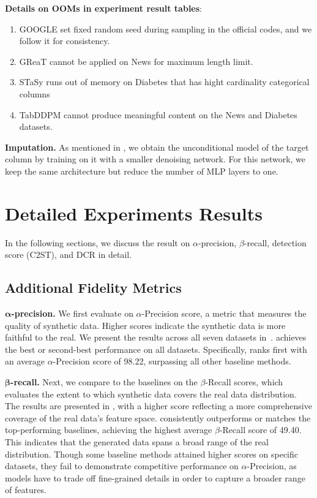 \textbf{Details on OOMs in experiment result tables}:
\begin{enumerate}
    \item GOOGLE set fixed random seed during sampling in the official codes, and we follow it for consistency.
    \item GReaT cannot be applied on News for maximum length limit.
    \item STaSy runs out of memory on Diabetes that has hight cardinality categorical columns
    \item TabDDPM cannot produce meaningful content on the News and Diabetes datasets.
\end{enumerate}

\textbf{Imputation.}
As mentioned in , we obtain the unconditional model of the target column by training \method on it with a smaller denoising network. For this network, we keep the same architecture but reduce the number of MLP layers to one.

\section{Detailed Experiments Results} \label{appendix:detailed_experiment_results}

In the following sections, we discuss the result on $\alpha$-precision, $\beta$-recall, detection score (C2ST), and DCR in detail.

\subsection{Additional Fidelity Metrics}
\label{appendix:alpha_beta_dcr}
\textbf{$\bm{\alpha}$-precision.} We first evaluate \method on $\alpha$-Precision score, a metric that measures the quality of synthetic data. Higher scores indicate the synthetic data is more faithful to the real. We present the results across all seven datasets in~. \method achieves the best or second-best performance on all datasets. Specifically, \method ranks first with an average $\alpha$-Precision score of 98.22, surpassing all other baseline methods. 

\textbf{$\bm{\beta}$-recall.} Next, we compare \method to the baselines on the $\beta$-Recall scores, which evaluates the extent to which synthetic data covers the real data distribution. The results are presented in , with a higher score reflecting a more comprehensive coverage of the real data’s feature space. \method consistently outperforms or matches the top-performing baselines, achieving the highest average $\beta$-Recall score of 49.40. This indicates that the generated data spans a broad range of the real distribution. Though some baseline methods attained higher scores on specific datasets, they fail to demonstrate competitive performance on $\alpha$-Precision, as models have to trade off fine-grained details in order to capture a broader range of features.

